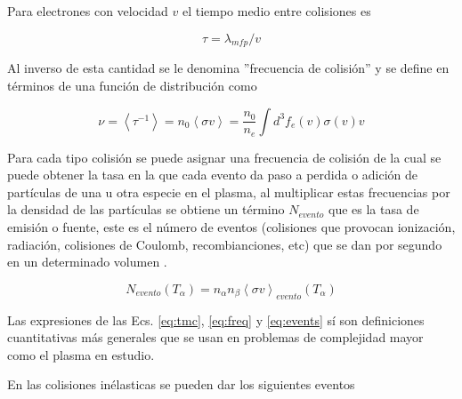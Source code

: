   Para electrones con velocidad $v$ el tiempo medio entre colisiones es

  \begin{equation}\label{eq:tmc}
    \tau = \lambda_{mfp}/v
  \end{equation}

  Al inverso de esta cantidad se le denomina ''frecuencia de colisi\'on'' y se define en t\'erminos de una funci\'on de distribuci\'on como
  
  \begin{equation}\label{eq:freq}
    \nu = \left<\tau^{-1}\right> = n_0\left<\sigma v\right> = \frac{n_0}{n_e}\int d^3 f_e(v)\sigma(v)v
  \end{equation}

  Para cada tipo colisi\'on se puede asignar una frecuencia de colisi\'on de la cual se puede obtener la tasa en la que cada evento da paso a perdida o adici\'on de part\'iculas de una u otra especie en el plasma, al multiplicar estas frecuencias por la densidad de las part\'iculas se obtiene un t\'ermino $N_{evento}$ que es la tasa de emisi\'on o fuente, este es el n\'umero de eventos (colisiones que provocan ionizaci\'on, radiaci\'on, colisiones de Coulomb, recombianciones, etc) que se dan por segundo en un determinado volumen \cite{lechte2002}.

  \begin{equation}\label{eq:events}
    N_{evento}(T_\alpha) = n_\alpha n_\beta\left<\sigma v\right>_{evento}(T_\alpha) 
  \end{equation}

  Las expresiones de las Ecs. \eqref{eq:tmc}, \eqref{eq:freq} y \eqref{eq:events} s\'i son definiciones cuantitativas m\'as generales que se usan en problemas de complejidad mayor como el plasma en estudio.

  En las colisiones in\'elasticas se pueden dar los siguientes eventos

